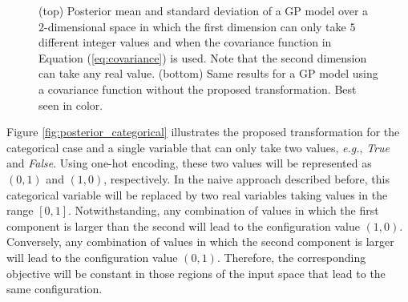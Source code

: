 \begin{figure}[htb]
\begin{center}
\begin{tabular}{lcc}
\end{tabular}
\end{center}
\caption{{\small (top) Posterior mean and standard deviation of a GP model over a 2-dimensional space in which the first dimension
can only take $5$ different integer values and when the covariance function in Equation (\ref{eq:covariance}) is used. Note that the second
dimension can take any real value. (bottom) Same results for a GP model using a covariance function without the proposed
transformation.  Best seen in color.}}
\label{fig:posterior}
\end{figure}

Figure \ref{fig:posterior_categorical} illustrates the proposed transformation for the categorical case and a
single variable that can only take two values, \emph{e.g.}, \emph{True} and \emph{False}. Using one-hot encoding,
these two values will be represented as $(0,1)$ and $(1,0)$, respectively. In the naive approach described before, this
categorical variable will be replaced by two real variables taking values in the range $[0,1]$. Notwithstanding, any
combination of values in which the first component is larger than the second will lead to the configuration value $(1,0)$.
Conversely, any combination of values in which the second component is larger will lead to the configuration value $(0,1)$.
Therefore, the corresponding objective will be constant in those regions of the input space that lead to the same configuration.

